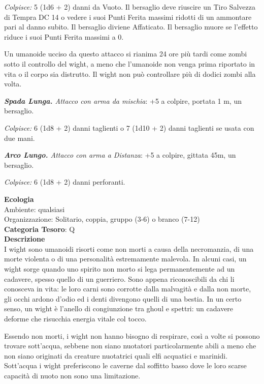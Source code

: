 \begin{multicols}{2}
{\emph{Colpisce:} 5 (1d6 + 2) danni da Vuoto. Il bersaglio deve riuscire un Tiro Salvezza di Tempra DC 14 o vedere i suoi Punti Ferita massimi ridotti di un ammontare pari al danno subito. Il bersaglio diviene Affaticato. Il bersaglio muore se l'effetto riduce i suoi Punti Ferita massimi a 0.

Un umanoide ucciso da questo attacco si rianima 24 ore più tardi come zombi sotto il controllo del wight, a meno che l'umanoide non venga prima riportato in vita o il corpo sia distrutto. Il wight non può controllare più di dodici zombi alla volta.

\emph{\textbf{Spada Lunga.} Attacco con arma da mischia}: +5 a colpire, portata 1 m, un bersaglio.

\emph{Colpisce:} 6 (1d8 + 2) danni taglienti o 7 (1d10 + 2) danni taglienti se usata con due mani.

\emph{\textbf{Arco Lungo.} Attacco con arma a Distanza}: +5 a colpire, gittata 45m, un bersaglio.

\emph{Colpisce:} 6 (1d8 + 2) danni perforanti.

\textbf{Ecologia}\\
Ambiente: qualsiasi\\
Organizzazione: Solitario, coppia, gruppo (3-6) o branco (7-12)\\
\textbf{Categoria Tesoro}: Q\\
\textbf{Descrizione}\\
I wight sono umanoidi risorti come non morti a causa della necromanzia, di una morte violenta o di una personalità estremamente malevola. In alcuni casi, un wight sorge quando uno spirito non morto si lega permanentemente ad un cadavere, spesso quello di un guerriero. Sono appena riconoscibili da chi li conosceva in vita: le loro carni sono corrotte dalla malvagità e dalla non morte, gli occhi ardono d'odio ed i denti divengono quelli di una bestia. In un certo senso, un wight è l'anello di congiunzione tra ghoul e spettri: un cadavere deforme che risucchia energia vitale col tocco.

Essendo non morti, i wight non hanno bisogno di respirare, così a volte si possono trovare sott'acqua, sebbene non siano nuotatori particolarmente abili a meno che non siano originati da creature nuotatrici quali elfi acquatici e marinidi. Sott'acqua i wight preferiscono le caverne dal soffitto basso dove le loro scarse capacità di nuoto non sono una limitazione.

}
\end{multicols}
